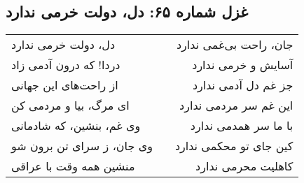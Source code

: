\begin{center}
\section*{غزل شماره ۶۵: دل، دولت خرمی ندارد}
\label{sec:065}
\begin{longtable}{l p{0.5cm} r}
دل، دولت خرمی ندارد
&&
جان، راحت بی‌غمی ندارد
\\
دردا! که درون آدمی زاد
&&
آسایش و خرمی ندارد
\\
از راحت‌های این جهانی
&&
جز غم دل آدمی ندارد
\\
ای مرگ، بیا و مردمی کن
&&
این غم سر مردمی ندارد
\\
وی غم، بنشین، که شادمانی
&&
با ما سر همدمی ندارد
\\
وی جان، ز سرای تن برون شو
&&
کین جای تو محکمی ندارد
\\
منشین همه وقت با عراقی
&&
کاهلیت محرمی ندارد
\\
\end{longtable}
\end{center}
